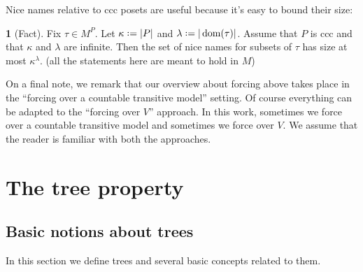 \documentclass[11pt,a4paper]{report}
\theoremstyle{definition}
\theoremstyle{num.custom-title}
\theoremstyle{custom-title}
\newtheorem*{teo_custom-title_nonum}{}
\DeclareMathOperator{\dom}{dom}
\newcommand*{\defeq}{\mathrel{\rlap{%
                     \raisebox{0.3ex}{$\cdot$}}%
                     \raisebox{-0.3ex}{$\cdot$}}%
                     =}
\begin{document}
Nice names relative to ccc posets are useful because it's easy to bound their size:

\begin{teo_custom-title_nonum}[Fact]\label{lemma-counting_nice_names}
Fix $\tau \in M^P$. Let $\kappa \defeq |P|$ and $\lambda \defeq |\dom(\tau)|$. Assume that $P$ is ccc and that $\kappa$ and $\lambda$ are infinite. Then the set of nice names for subsets of $\tau$ has size at most $\kappa^\lambda$. (all the statements here are meant to hold in $M$)
\end{teo_custom-title_nonum}

On a final note, we remark that our overview about forcing above takes place in the ``forcing over a countable transitive model'' setting. Of course everything can be adapted to the ``forcing over $V$'' approach. In this work, sometimes we force over a countable transitive model and sometimes we force over $V$. We assume that the reader is familiar with both the approaches.









\chapter{The tree property}


\section{Basic notions about trees}

In this section we define trees and several basic concepts related to them.
\end{document}
